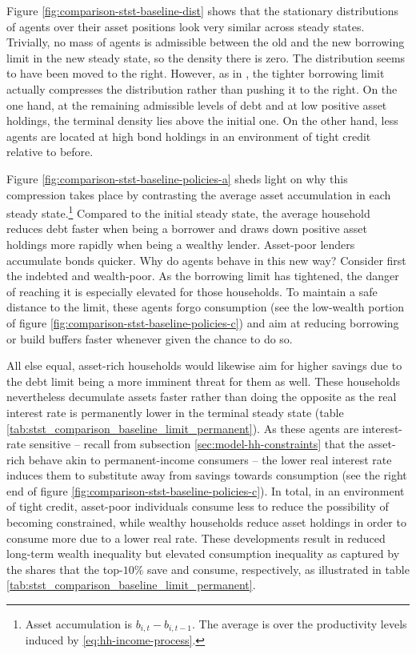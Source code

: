 \documentclass[a4paper,12pt]{article} %
\numberwithin{equation}{section} %
\numberwithin{figure}{section}
\numberwithin{table}{section}
\begin{document}
Figure \ref{fig:comparison-stst-baseline-dist} shows that the stationary distributions of agents over their asset positions look very similar across steady states. Trivially, no mass of agents is admissible between the old and the new borrowing limit in the new steady state, so the density there is zero. The distribution seems to have been moved to the right. However, as in \textcite{gl2017}, the tighter borrowing limit actually compresses the distribution rather than pushing it to the right. On the one hand, at the remaining admissible levels of debt and at low positive asset holdings, the terminal density lies above the initial one. On the other hand, less agents are located at high bond holdings in an environment of tight credit relative to before.

Figure \ref{fig:comparison-stst-baseline-policies-a} sheds light on why this compression takes place by contrasting the average asset accumulation in each steady state.\footnote{Asset accumulation is $b_{i,t} - b_{i,t-1}$. The average is over the productivity levels induced by \eqref{eq:hh-income-process}.} Compared to the initial steady state, the average household reduces debt faster when being a borrower and draws down positive asset holdings more rapidly when being a wealthy lender. Asset-poor lenders accumulate bonds quicker. Why do agents behave in this new way? Consider first the indebted and wealth-poor. As the borrowing limit has tightened, the danger of reaching it is especially elevated for those households. To maintain a safe distance to the limit, these agents forgo consumption (see the low-wealth portion of figure \ref{fig:comparison-stst-baseline-policies-c}) and aim at reducing borrowing or build buffers faster whenever given the chance to do so.

All else equal, asset-rich households would likewise aim for higher savings due to the debt limit being a more imminent threat for them as well. These households nevertheless decumulate assets faster rather than doing the opposite as the real interest rate is permanently lower in the terminal steady state (table \ref{tab:stst_comparison_baseline_limit_permanent}). As these agents are interest-rate sensitive -- recall from subsection \ref{sec:model-hh-constraints} that the asset-rich behave akin to permanent-income consumers -- the lower real interest rate induces them to substitute away from savings towards consumption (see the right end of figure \ref{fig:comparison-stst-baseline-policies-c}). In total, in an environment of tight credit, asset-poor individuals consume less to reduce the possibility of becoming constrained, while wealthy households reduce asset holdings in order to consume more due to a lower real rate. These developments result in reduced long-term wealth inequality but elevated consumption inequality as captured by the shares that the top-$10\%$ save and consume, respectively, as illustrated in table \ref{tab:stst_comparison_baseline_limit_permanent}.
\end{document}
